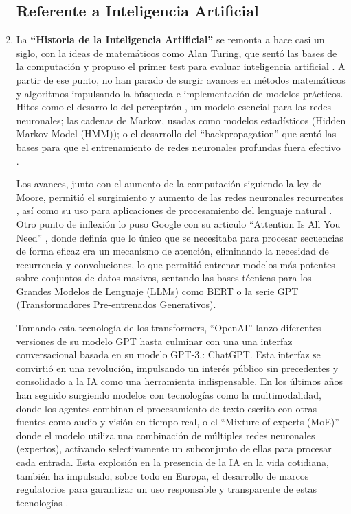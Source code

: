 \begin{enumerate}
		\newpage
		
		
	\subsection{Referente a Inteligencia Artificial}
		
	\item La \textbf{``Historia de la Inteligencia Artificial''} \label{def12} se remonta a hace casi un siglo, con la ideas de matemáticos como Alan Turing, que sentó las bases de la computación y propuso el primer test para evaluar inteligencia artificial \citep{Cheok2023AIHistory}. A partir de ese punto, no han parado de surgir avances en métodos matemáticos y algoritmos impulsando la búsqueda e implementación de modelos prácticos. Hitos como el desarrollo del perceptrón \citep{rosenblatt1958perceptron}, un modelo esencial para las redes neuronales; las cadenas de Markov, usadas como modelos estadísticos (Hidden Markov Model (HMM)); o el desarrollo del ``backpropagation'' que sentó las bases para que el entrenamiento de redes neuronales profundas fuera efectivo \citep{Werbos1974Backpropagation}. 
	
	Los avances, junto con el aumento de la computación siguiendo la ley de Moore, permitió el surgimiento y aumento de las redes neuronales recurrentes \citep{Hopfield1984RNN}, así como su uso para aplicaciones de procesamiento del lenguaje natural \citep{bengio2003neural}. Otro punto de inflexión lo puso Google con su articulo ``Attention Is All You Need'' \citep{vaswani2017attention}, donde definía que lo único que se necesitaba para procesar secuencias de forma eficaz era un mecanismo de atención, eliminando la necesidad de recurrencia y convoluciones, lo que permitió entrenar modelos más potentes sobre conjuntos de datos masivos, sentando las bases técnicas para los Grandes Modelos de Lenguaje (LLMs) como BERT o la serie GPT (Transformadores Pre-entrenados Generativos). 
	
	Tomando esta tecnología de los transformers, ``OpenAI'' lanzo diferentes versiones de su modelo GPT hasta culminar con una una interfaz conversacional basada en su modelo GPT-3,: ChatGPT. Esta interfaz se convirtió en una revolución, impulsando un interés público sin precedentes y consolidado a la IA como una herramienta indispensable. En los últimos años han seguido surgiendo modelos con tecnologías como la multimodalidad, donde los agentes combinan el procesamiento de texto escrito con otras fuentes como audio y visión en tiempo real, o el ``Mixture of experts (MoE)'' \citep{Jiang2024Mixtral} donde el modelo utiliza una combinación de múltiples redes neuronales (expertos), activando selectivamente un subconjunto de ellas para procesar cada entrada. Esta explosión en la presencia de la IA en la vida cotidiana, también ha impulsado, sobre todo en Europa, el desarrollo de marcos regulatorios para garantizar un uso responsable y transparente de estas tecnologías \citep{webRIA2024Europa}.
	

\end{enumerate}
